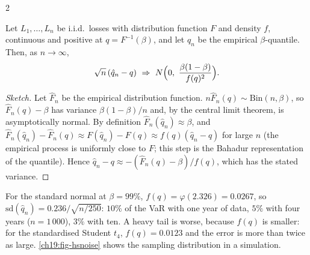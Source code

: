 \begin{paracol}{2}
\begin{proposition}\label{ch19:prop-quantile}
Let $L_1,\dots,L_n$ be i.i.d.\ losses with distribution function $F$ and density $f$, continuous and positive at $q=F^{-1}(\beta)$, and let $\hat q_n$ be the empirical $\beta$-quantile. Then, as $n\to\infty$,
\[
  \sqrt n\,(\hat q_n-q)\ \Rightarrow\ N\Bigl(0,\ \frac{\beta(1-\beta)}{f(q)^2}\Bigr).
\]
\end{proposition}
\begin{proof}[Sketch]
Let $\hat F_n$ be the empirical distribution function. $n\hat F_n(q)\sim\mathrm{Bin}(n,\beta)$, so $\hat F_n(q)-\beta$ has variance $\beta(1-\beta)/n$ and, by the central limit theorem, is asymptotically normal. By definition $\hat F_n(\hat q_n)\approx\beta$, and $\hat F_n(\hat q_n)-\hat F_n(q)\approx F(\hat q_n)-F(q)\approx f(q)(\hat q_n-q)$ for large $n$ (the empirical process is uniformly close to $F$; this step is the Bahadur representation of the quantile). Hence $\hat q_n-q\approx-(\hat F_n(q)-\beta)/f(q)$, which has the stated variance.
\end{proof}
For the standard normal at $\beta=99\%$, $f(q)=\varphi(2.326)=0.0267$, so $\mathrm{sd}(\hat q_n)=0.236/\sqrt{n/250}$: $10\%$ of the VaR with one year of data, $5\%$ with four years ($n=1\,000$), $3\%$ with ten. A heavy tail is worse, because $f(q)$ is smaller: for the standardised Student $t_4$, $f(q)=0.0123$ and the error is more than twice as large. \cref{ch19:fig-hsnoise} shows the sampling distribution in a simulation.


\end{paracol}
